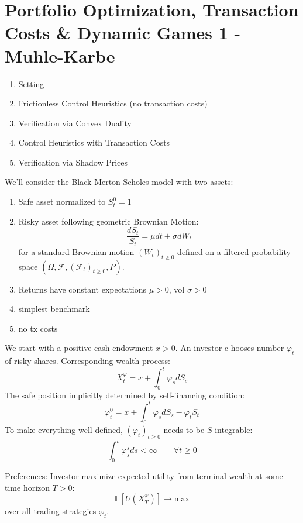 \chapter{Portfolio Optimization, Transaction Costs \& Dynamic Games 1 - Muhle-Karbe}
\begin{enumerate}
	\item Setting
	\item Frictionless Control Heuristics (no transaction costs)
	\item Verification via Convex Duality
	\item Control Heuristics with Transaction Costs
	\item Verification via Shadow Prices
\end{enumerate}

We'll consider the Black-Merton-Scholes model with two assets:
\begin{enumerate}
	\item Safe asset normalized to $S^0_t=1$
	\item Risky asset following geometric Brownian Motion:
	\begin{equation}
		\frac{dS_t}{S_t} = \mu dt + \sigma dW_t
	\end{equation}
	for a standard Brownian motion $(W_t)_{t\geq 0}$ defined on a filtered probability space $(\Omega, \mathcal{F}, (\mathcal{F}_t)_{t\geq 0}, P)$.
	\item Returns have constant expectations $\mu > 0$, vol $\sigma >0$
	\item simplest benchmark
	\item no tx costs
\end{enumerate}

We start with a positive cash endowment $x > 0$. An investor c hooses number $\varphi_t$ of risky shares. Corresponding wealth process:
\begin{equation}
	X_t^{\varphi} = x + \int_0^t \varphi_s dS_s
\end{equation}
The safe position implicitly determined by self-financing condition:
\begin{equation}
	\varphi_t^0 = x + \int_0^t \varphi_s dS_s - \varphi_t S_t
\end{equation}
To make everything well-defined, $(\varphi_t)_{t\geq 0}$ needs to be $S$-integrable:
\begin{equation}
	\int_0^t \varphi_s^s ds < \infty \qquad \forall t \geq 0
\end{equation}

Preferences: Investor maximize expected utility from terminal wealth at some time horizon $T>0$:
\begin{equation}
	\mathbb{E}\left[ U(X^\varphi_T) \right] \to \text{max}
\end{equation}
over all trading strategies $\varphi_t$.

